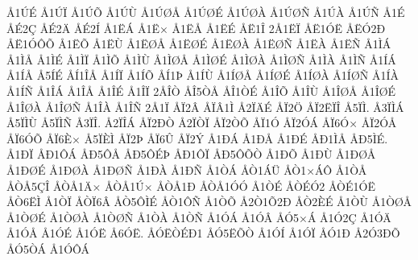 {^^c51^^da^^c9
^^c51^^da^^cf
^^c51^^da^^d5
^^c51^^da^^d9
^^c51^^da^^d8^^c5
^^c51^^da^^d8^^c9
^^c51^^da^^d8^^c0
^^c51^^da^^d8^^d1
^^c51^^da^^c0
^^c51^^da^^d1
^^c51^^c9
^^c5^^c92^^c7
^^c5^^c92^^c4
^^c5^^c92^^cd
^^c51^^cb^^c1
^^c51^^cb^^d7
^^c51^^cb^^c5
^^c51^^cb^^c9
^^c5^^cb1^^ce
2^^c51^^cb^^cf
^^c5^^cb1^^d3^^cb
^^c5^^cb^^d32^^d0
^^c5^^cb1^^d3^^d4^^d5
^^c51^^cb^^d5
^^c51^^cb^^d9
^^c51^^cb^^d8^^c5
^^c51^^cb^^d8^^c9
^^c51^^cb^^d8^^c0
^^c51^^cb^^d8^^d1
^^c51^^cb^^c0
^^c51^^cb^^d1
^^c51^^cc^^c1
^^c51^^cc^^c5
^^c51^^cc^^c9
^^c51^^cc^^cf
^^c51^^cc^^d5
^^c51^^cc^^d9
^^c51^^cc^^d8^^c5
^^c51^^cc^^d8^^c9
^^c51^^cc^^d8^^c0
^^c51^^cc^^d8^^d1
^^c51^^cc^^c0
^^c51^^cc^^d1
^^c51^^cd^^c1
^^c51^^cd^^c5
^^c55^^cd^^c9
^^c5^^cd1^^ce^^c5
^^c51^^cd^^cf
^^c51^^cd^^d5
^^c5^^cd1^^de
^^c51^^cd^^d9
^^c51^^cd^^d8^^c5
^^c51^^cd^^d8^^c9
^^c51^^cd^^d8^^c0
^^c51^^cd^^d8^^d1
^^c51^^cd^^c0
^^c51^^cd^^d1
^^c51^^ce^^c1
^^c51^^ce^^c5
^^c51^^ce^^c9
^^c51^^ce^^cf
2^^c5^^ce^^d2
^^c5^^ce5^^d2^^c5
^^c5^^ce1^^d2^^c9
^^c51^^ce^^d5
^^c51^^ce^^d9
^^c51^^ce^^d8^^c5
^^c51^^ce^^d8^^c9
^^c51^^ce^^d8^^c0
^^c51^^ce^^d8^^d1
^^c51^^ce^^c0
^^c51^^ce^^d1
2^^c51^^cf
^^c5^^cf2^^c2
^^c5^^cf^^c21^^cc
^^c52^^cf^^c4^^c9
^^c5^^cf2^^d6
^^c5^^cf2^^cb^^cf^^ce
^^c55^^cf^^cc.
^^c53^^cf^^cc^^c1
^^c55^^cf^^cc^^d9
^^c55^^cf^^cc^^d1
^^c53^^cf^^ce.
^^c52^^cf^^ce^^c1
^^c5^^cf2^^d0^^d2
^^c52^^cf^^d2^^cf
^^c5^^cf2^^d2^^d5
^^c5^^cf1^^d3
^^c5^^cf2^^d3^^c1
^^c5^^cf6^^d3^^d7
^^c5^^cf2^^d3^^c5
^^c5^^cf6^^d3^^d5
^^c5^^cf6^^c8^^d7
^^c55^^cf^^c8^^cc
^^c5^^cf2^^de
^^c5^^cf6^^db
^^c5^^cf2^^dd
^^c51^^d0^^c1
^^c51^^d0^^c5
^^c51^^d0^^c9
^^c5^^d01^^cc^^c5
^^c5^^d05^^cc^^c9.
^^c51^^d0^^cf
^^c5^^d01^^d4^^c1
^^c5^^d05^^d4^^c5
^^c5^^d05^^d4^^c9^^de
^^c5^^d01^^d4^^cf
^^c5^^d05^^d4^^d5^^d2
^^c51^^d0^^d5
^^c51^^d0^^d9
^^c51^^d0^^d8^^c5
^^c51^^d0^^d8^^c9
^^c51^^d0^^d8^^c0
^^c51^^d0^^d8^^d1
^^c51^^d0^^c0
^^c51^^d0^^d1
^^c51^^d2^^c1
^^c5^^d21^^c1^^dc
^^c5^^d21^^d7^^c1^^d4
^^c51^^d2^^c5
^^c5^^d2^^c55^^c7^^ce
^^c5^^d2^^c51^^c4^^d7
^^c5^^d2^^c51^^da^^d7
^^c5^^d2^^c51^^d0
^^c5^^d2^^c51^^d3^^d3
^^c51^^d2^^c9
^^c5^^d2^^c9^^d32
^^c5^^d2^^c91^^d3^^cb
^^c5^^d26^^cb^^cc
^^c51^^d2^^cf
^^c5^^d2^^cf6^^c2
^^c5^^d25^^d4^^cc^^c9
^^c5^^d21^^d4^^d1
^^c51^^d2^^d5
^^c52^^d21^^d52^^d0
^^c5^^d22^^c8^^c9
^^c51^^d2^^d9
^^c51^^d2^^d8^^c5
^^c51^^d2^^d8^^c9
^^c51^^d2^^d8^^c0
^^c51^^d2^^d8^^d1
^^c51^^d2^^c0
^^c51^^d2^^d1
^^c51^^d3^^c1
^^c51^^d3^^c2
^^c5^^d35^^d7^^c1
^^c51^^d32^^c7
^^c51^^d3^^c4
^^c51^^d3^^c5
^^c51^^d3^^c9
^^c51^^d3^^cb
^^c56^^d3^^cb.
^^c5^^d3^^cb^^d2^^c9^^d01
^^c5^^d35^^cb^^d5^^d2
^^c51^^d3^^cd
^^c51^^d3^^cf
^^c5^^d31^^d0
^^c52^^d33^^d0^^d5
^^c5^^d35^^d2^^c1
^^c51^^d3^^d4^^c1
}
